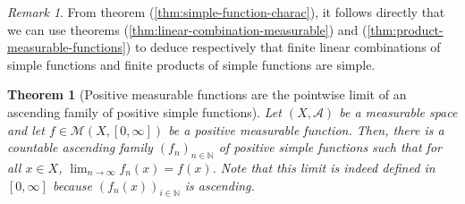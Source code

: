 \documentclass{article}
\newtheorem{theorem}{Theorem}[section]
\theoremstyle{definition}
\theoremstyle{remark}
\newtheorem*{remark}{Remark}
\theoremstyle{example}
\theoremstyle{notation}
\begin{document}
\begin{remark}
		From theorem (\ref{thm:simple-function-charac}), it follows directly that we can use theorems (\ref{thm:linear-combination-measurable}) and (\ref{thm:product-measurable-functions}) to deduce respectively that finite linear combinations of simple functions and finite products of simple functions are simple.
\end{remark}

\begin{theorem}[Positive measurable functions are the pointwise limit of an ascending family of positive simple functions] \label{thm:pointwise-simple} %
		Let $(X, \mathcal{A})$ be a measurable space and let $f \in \mathcal{M}(X, [0, \infty])$ be a positive measurable function. Then, there is a countable ascending family $(f_n)_{n \in \mathbb{N}}$ of positive simple functions such that for all $x \in X$, $\lim_{n \rightarrow \infty} f_n(x) = f(x)$. Note that this limit is indeed defined in $[0, \infty]$ because $(f_n(x))_{i \in \mathbb{N}}$ is ascending.
\end{theorem}
\end{document}
